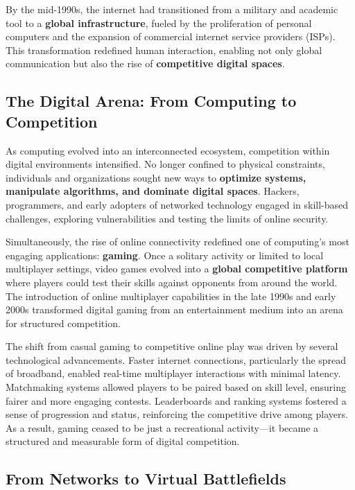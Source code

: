 By the mid-1990s, the internet had transitioned from a military and academic tool to a \textbf{global infrastructure}, fueled by the proliferation of personal computers and the expansion of commercial internet service providers (ISPs). This transformation redefined human interaction, enabling not only global communication but also the rise of \textbf{competitive digital spaces}.

\subsection{The Digital Arena: From Computing to Competition}

As computing evolved into an interconnected ecosystem, competition within digital environments intensified. No longer confined to physical constraints, individuals and organizations sought new ways to \textbf{optimize systems, manipulate algorithms, and dominate digital spaces}. Hackers, programmers, and early adopters of networked technology engaged in skill-based challenges, exploring vulnerabilities and testing the limits of online security.

Simultaneously, the rise of online connectivity redefined one of computing’s most engaging applications: \textbf{gaming}. Once a solitary activity or limited to local multiplayer settings, video games evolved into a \textbf{global competitive platform} where players could test their skills against opponents from around the world. The introduction of online multiplayer capabilities in the late 1990s and early 2000s transformed digital gaming from an entertainment medium into an arena for structured competition.

The shift from casual gaming to competitive online play was driven by several technological advancements. Faster internet connections, particularly the spread of broadband, enabled real-time multiplayer interactions with minimal latency. Matchmaking systems allowed players to be paired based on skill level, ensuring fairer and more engaging contests. Leaderboards and ranking systems fostered a sense of progression and status, reinforcing the competitive drive among players. As a result, gaming ceased to be just a recreational activity—it became a structured and measurable form of digital competition.

\subsection{From Networks to Virtual Battlefields}


